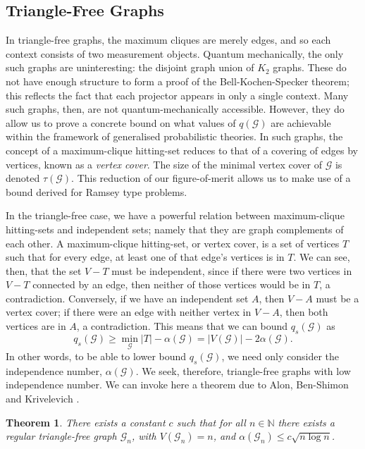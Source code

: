 \documentclass{amsart}
\newtheorem{thm}{Theorem}
\theoremstyle{definition}
\begin{document}
\subsection{Triangle-Free Graphs}

In triangle-free graphs, the maximum cliques are merely edges, and so each context consists of two measurement objects. Quantum mechanically, the only such graphs are uninteresting: the disjoint graph union of $K_2$ graphs. These do not have enough structure to form a proof of the Bell-Kochen-Specker theorem; this reflects the fact that each projector appears in only a single context. Many such graphs, then, are not quantum-mechanically accessible. However, they do allow us to prove a concrete bound on what values of $q(\mathcal{G})$ are achievable within the framework of generalised probabilistic theories. In such graphs, the concept of a maximum-clique hitting-set reduces to that of a covering of edges by vertices, known as a \emph{vertex cover}. The size of the minimal vertex cover of $\mathcal{G}$ is denoted $\tau(\mathcal{G})$. This reduction of our figure-of-merit allows us to make use of a bound derived for Ramsey type problems.

In the triangle-free case, we have a powerful relation between maximum-clique hitting-sets and independent sets; namely that they are graph complements of each other. A maximum-clique hitting-set, or vertex cover, is a set of vertices $T$ such that for every edge, at least one of that edge's vertices is in $T$. We can see, then, that the set $V-T$ must be independent, since if there were two vertices in $V-T$ connected by an edge, then neither of those vertices would be in $T$, a contradiction. Conversely, if we have an independent set $A$, then $V-A$ must be a vertex cover; if there were an edge with neither vertex in $V-A$, then both vertices are in $A$, a contradiction. This means that we can bound $q_s(\mathcal{G})$ as
\begin{equation}
q_s(\mathcal{G})\geq \min_\mathcal{G} |T| - \alpha(\mathcal{G}) = |V(\mathcal{G})|-2\alpha(\mathcal{G}).
\end{equation}
In other words, to be able to lower bound $q_s(\mathcal{G})$, we need only consider the independence number, $\alpha(\mathcal{G})$. We seek, therefore, triangle-free graphs with low independence number. We can invoke here a theorem due to Alon, Ben-Shimon and Krivelevich \cite{Alon2010}.
\begin{thm}
There exists a constant $c$ such that for all $n\in\mathbb{N}$ there exists a regular triangle-free graph $\mathcal{G}_n$, with $V(\mathcal{G}_n)=n$, and $\alpha(\mathcal{G}_n)\leq c\sqrt{n\log n}$.
\end{thm}
\end{document}
